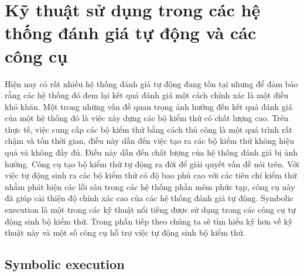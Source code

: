 \documentclass[12pt,a4paper]{article}
\begin{document}
\section{Kỹ thuật sử dụng trong các hệ thống đánh giá tự động và các công cụ}
Hiện nay có rất nhiều hệ thống đánh giá tự động đang tồn tại nhưng để đảm bảo rằng các hệ thống đó đem lại kết quả đánh giá một cách chính xác là một điều khó khăn. Một trong những vấn đề quan trọng ảnh hưởng đến kết quả đánh giá của một hệ thống đó là việc xây dựng các bộ kiểm thử có chất lượng cao. Trên thực tế, việc cung cấp các bộ kiểm thử bằng cách thủ công là một quá trình rất chậm và tốn thời gian, điều này dẫn đến việc tạo ra các bộ kiểm thử không hiệu quả và không đầy đủ. Điều này dẫn đến chất lượng của hệ thống đánh giá bị ảnh hưởng.\newline
\indent Công cụ tạo bộ kiểm thử tự động ra đời để giải quyết vấn đề nói trên. Với việc tự động sinh ra các bộ kiểm thử có độ bao phủ cao với các tiêu chí kiểm thử nhằm phát hiện các lỗi sâu trong các hệ thống phần mêm phức tạp, công cụ này đã giúp cải thiện độ chính xác cao của các hệ thống đánh giá tự động. Symbolic execution là một trong các kỹ thuật nổi tiếng được sử dụng trong các công cụ tự động sinh bộ kiểm thử. Trong phần tiếp theo chúng ta sẽ tìm hiểu kỹ hơn về kỹ thuật này và một số công cụ hỗ trợ việc tự động sinh bộ kiểm thử.
\subsection{Symbolic execution}
\end{document}
